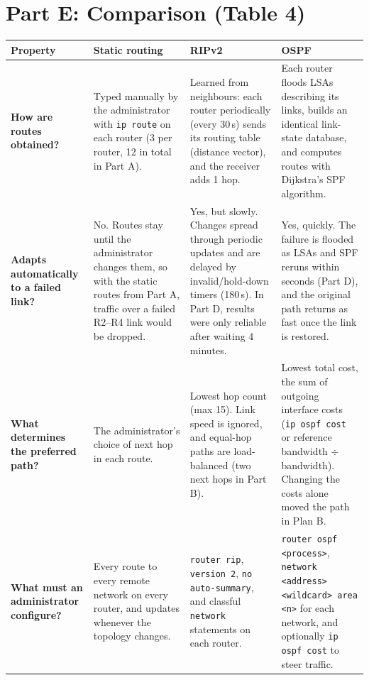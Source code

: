 \documentclass[11pt,a4paper]{article}
\newcommand{\cmd}[1]{\texttt{#1}}
\begin{document}
\section{Part E: Comparison (Table 4)}

\begin{table}[H]\centering\small
\renewcommand{\arraystretch}{1.3}
\begin{tabularx}{\linewidth}{>{\raggedright\bfseries}p{2.4cm}
  >{\raggedright\arraybackslash}X >{\raggedright\arraybackslash}X >{\raggedright\arraybackslash}X}
\toprule
Property & \textbf{Static routing} & \textbf{RIPv2} & \textbf{OSPF} \\
\midrule
How are routes obtained? &
Typed manually by the administrator with \cmd{ip route} on each router (3 per router, 12 in total in Part A). &
Learned from neighbours: each router periodically (every 30\,s) sends its routing table (distance vector), and the receiver adds 1 hop. &
Each router floods LSAs describing its links, builds an identical link-state database, and computes routes with Dijkstra's SPF algorithm. \\
\midrule
Adapts automatically to a failed link? &
No. Routes stay until the administrator changes them, so with the static routes from Part A, traffic over a failed R2--R4 link would be dropped. &
Yes, but slowly. Changes spread through periodic updates and are delayed by invalid/hold-down timers (180\,s). In Part D, results were only reliable after waiting 4 minutes. &
Yes, quickly. The failure is flooded as LSAs and SPF reruns within seconds (Part D), and the original path returns as fast once the link is restored. \\
\midrule
What determines the preferred path? &
The administrator's choice of next hop in each route. &
Lowest hop count (max 15). Link speed is ignored, and equal-hop paths are load-balanced (two next hops in Part B). &
Lowest total cost, the sum of outgoing interface costs (\cmd{ip ospf cost} or reference bandwidth $\div$ bandwidth). Changing the costs alone moved the path in Plan B. \\
\midrule
What must an administrator configure? &
Every route to every remote network on every router, and updates whenever the topology changes. &
\cmd{router rip}, \cmd{version 2}, \cmd{no auto-summary}, and classful \cmd{network} statements on each router. &
\cmd{router ospf <process>}, \cmd{network <address> <wildcard> area <n>} for each network, and optionally \cmd{ip ospf cost} to steer traffic. \\
\bottomrule
\end{tabularx}
\end{table}
\end{document}
